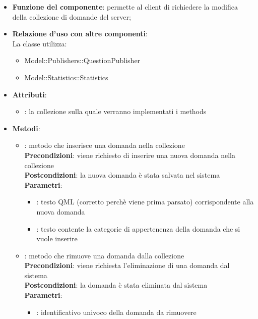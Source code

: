 \begin{itemize}
\item\textbf{Funzione del componente}: permette al client di richiedere la modifica della collezione di domande del server;
	\item\textbf{Relazione d'uso con altre componenti}: \\
La classe utilizza:
	\begin{itemize}
		\item Model::Publishers::QuestionPublisher
		\item Model::Statistics::Statistics
	\end{itemize}
\item\textbf{Attributi}:
	\begin{itemize}
		\item{}: la collezione sulla quale verranno implementati i methods\\
	\end{itemize}
\item\textbf{Metodi}:
	\begin{itemize}
		\item{}: metodo che inserisce una domanda nella collezione\\
		\textbf{Precondizioni}: viene richiesto di inserire una nuova domanda nella collezione\\
		\textbf{Postcondizioni}: la nuova domanda è stata salvata nel sistema\\
		\textbf{Parametri}:
			\begin{itemize}
				\item{}: testo QML (corretto perchè viene prima parsato) corrispondente alla nuova domanda\\
				\item{}: testo contente la categorie di appertenenza della domanda che si vuole inserire\\
			\end{itemize}
		\item{}: metodo che rimuove una domanda dalla collezione\\
		\textbf{Precondizioni}: viene richiesta l'eliminazione di una domanda dal sistema\\
		\textbf{Postcondizioni}: la domanda è stata eliminata dal sistema\\
		\textbf{Parametri}:
			\begin{itemize}
				\item{}: identificativo univoco della domanda da rimuovere\\
			\end{itemize}
	\end{itemize}
\end{itemize}
\newpage


